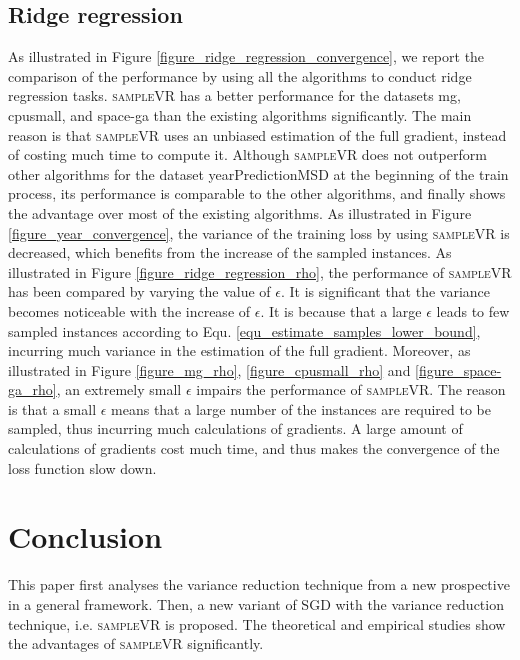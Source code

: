 \documentclass[letterpaper]{article}
\begin{document}
\subsection{Ridge regression}
\label{sect_performance_evaluation_convergence}
As illustrated in Figure \ref{figure_ridge_regression_convergence}, we report the comparison of the performance by using all the algorithms to  conduct  ridge regression tasks. \textsc{sampleVR} has a better performance for the datasets mg, cpusmall, and space-ga than the existing algorithms significantly. The main reason is that \textsc{sampleVR} uses an unbiased estimation of the full gradient, instead of costing much time to compute it.  Although \textsc{sampleVR} does not outperform other algorithms for the dataset yearPredictionMSD at the beginning of the train process, its performance is comparable to the other algorithms, and finally shows the advantage over most of the existing algorithms. As illustrated in Figure \ref{figure_year_convergence}, the variance of the training loss by using \textsc{sampleVR} is decreased, which benefits from the increase of the sampled instances. As illustrated in Figure \ref{figure_ridge_regression_rho}, the performance of \textsc{sampleVR} has been compared by varying the value of $\epsilon$. It is significant that the variance becomes noticeable with the increase of $\epsilon$. It is because that a large $\epsilon$ leads to few sampled instances  according to Equ. \ref{equ_estimate_samples_lower_bound}, incurring much variance in the estimation of the full gradient. Moreover, as illustrated in Figure \ref{figure_mg_rho}, \ref{figure_cpusmall_rho} and \ref{figure_space-ga_rho}, an extremely small  $\epsilon$  impairs  the performance of \textsc{sampleVR}. The reason is that a small $\epsilon$ means that a large number of the instances are required to be sampled, thus incurring  much calculations of gradients. A large amount of calculations of gradients cost much time, and thus makes the convergence of the loss function slow down.  



\section{Conclusion}
\label{sect_conclusion}
This paper first analyses the  variance reduction technique   from a new prospective in a general framework. Then, a new variant of SGD with the variance reduction technique, i.e. \textsc{sampleVR} is proposed. The theoretical and  empirical studies show the advantages of \textsc{sampleVR} significantly.




\end{document}
